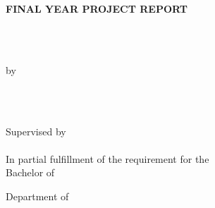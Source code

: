 \documentclass[a4paper]{memoir}
\begin{document}
\thispagestyle{empty}
\begin{LARGE}
\begin{center}

{\fontsize{18pt}{20pt}\selectfont
  \textbf{\MakeTextUppercase{Final Year Project Report}\\[48pt]}
}

{\fontsize{16pt}{18pt}\selectfont
  \textbf{\myTitle}\\[48pt]\
}

\vfill

{\fontsize{14pt}{16pt}\selectfont
  by

  \vfill
  \myName\\[10pt]
  \MakeTextUppercase{\myMatric}\\

  \vfill

  Supervised by\\[10pt]
  \mySupervisor\\

  \vfill
  In partial fulfillment of the requirement for the\\
  Bachelor of \myDepartment\\

  \vfill

  Department of \myDepartment\\
  \myKulliyyah\\
  \myUni\\

  \vfill

  \vfil
  \myTime\\
  \mySemester\\
}
\end{center}
\end{LARGE}
\end{document}

